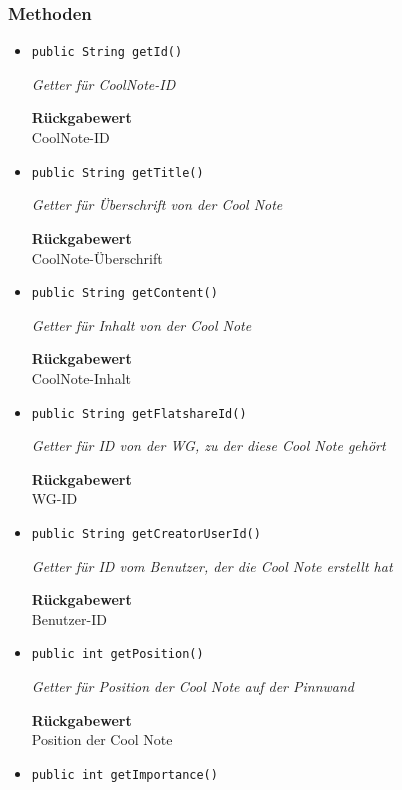     \subsubsection*{Methoden}
    \begin{itemize}
    	\item{\texttt{public String getId()}}
    	
    	\textit{Getter für CoolNote-ID}
    	
    	
    	
    	\textbf{Rückgabewert} \\
    	CoolNote-ID        \item{\texttt{public String getTitle()}}
    	
    	\textit{Getter für Überschrift von der Cool Note}
    	
    	
    	
    	\textbf{Rückgabewert} \\
    	CoolNote-Überschrift        \item{\texttt{public String getContent()}}
    	
    	\textit{Getter für Inhalt von der Cool Note}
    	
    	
    	
    	\textbf{Rückgabewert} \\
    	CoolNote-Inhalt        \item{\texttt{public String getFlatshareId()}}
    	
    	\textit{Getter für ID von der WG, zu der diese Cool Note gehört}
    	
    	
    	
    	\textbf{Rückgabewert} \\
    	WG-ID        \item{\texttt{public String getCreatorUserId()}}
    	
    	\textit{Getter für ID vom Benutzer, der die Cool Note erstellt hat}
    	
    	
    	
    	\textbf{Rückgabewert} \\
    	Benutzer-ID        \item{\texttt{public int getPosition()}}
    	
    	\textit{Getter für Position der Cool Note auf der Pinnwand}
    	
    	
    	
    	\textbf{Rückgabewert} \\
    	Position der Cool Note        \item{\texttt{public int getImportance()}}
    	

\end{itemize}
